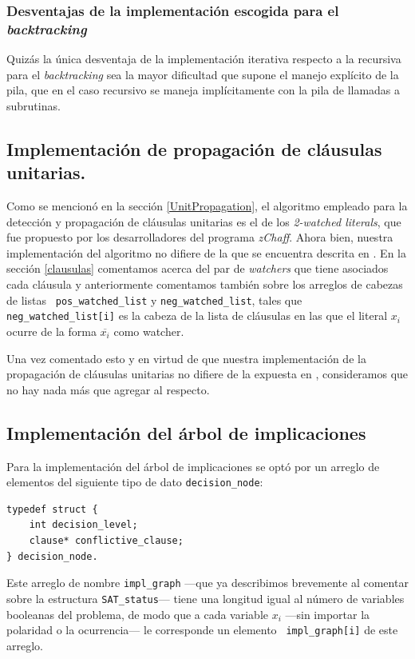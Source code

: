 \documentclass[12pt,lettersize,oneside]{article}
\begin{document}
\subsubsection{Desventajas de la implementación escogida para el \emph{backtracking}}
Quizás la única desventaja de la implementación iterativa respecto a la
recursiva para el \emph{backtracking} sea la mayor dificultad que supone el
manejo explícito de la pila, que en el caso recursivo se maneja implícitamente
con la pila de llamadas a subrutinas.


\subsection{Implementación de propagación de cláusulas unitarias.}
Como se mencionó en la sección \ref{UnitPropagation}, el algoritmo empleado para
la detección y propagación de cláusulas unitarias es el de los \emph{2-watched
  literals}, que fue propuesto por los desarrolladores del programa
\emph{zChaff}. Ahora bien, nuestra implementación del algoritmo no difiere de la
que se encuentra descrita en \cite{Zhang}. En la sección \ref{clausulas}
comentamos acerca del par de \emph{watchers} que tiene asociados cada cláusula y
anteriormente comentamos también sobre los arreglos de cabezas de listas {\tt
  pos\_watched\_list} y {\tt neg\_watched\_list}, tales que  {\tt
  neg\_watched\_list[i]} es la cabeza de la lista de cláusulas en las que el
literal $x_i$ ocurre de la forma $\overline{x_i}$ como watcher.

Una vez comentado esto y en virtud de que nuestra implementación de la
propagación de cláusulas unitarias no difiere de la expuesta en \cite{Zhang},
consideramos que no hay nada más que agregar al respecto.

\subsection{Implementación del árbol de implicaciones}\label{impl}
Para la implementación del árbol de implicaciones se optó por un arreglo de
elementos del siguiente tipo de dato {\tt decision\_node}:
\begin{lstlisting}
typedef struct {
    int decision_level;
    clause* conflictive_clause;
} decision_node.
\end{lstlisting}
Este arreglo de nombre {\tt impl\_graph} ---que ya describimos brevemente al
comentar sobre la estructura {\tt SAT\_status}--- tiene una longitud igual al
número de variables booleanas del problema, de modo que a cada variable $x_i$
---sin importar la polaridad o la ocurrencia--- le corresponde un elemento {\tt
  impl\_graph[i]} de este arreglo.
\end{document}
